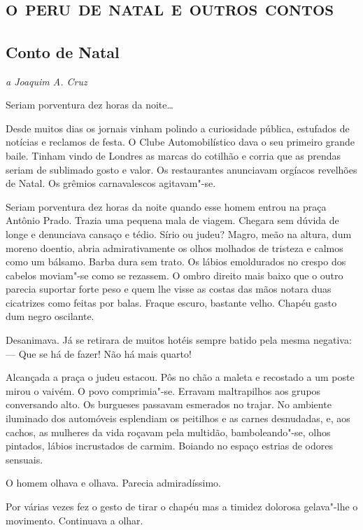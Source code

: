 \part{\textsc{o peru de natal e outros contos}}

\chapter{Conto de Natal}

\hfill{}\emph{a Joaquim A. Cruz}\bigskip


\noindent{}Seriam porventura dez horas da noite\ldots{}

Desde muitos dias os jornais vinham polindo a curiosidade pública,
estufados de notícias e reclamos de festa. O Clube Automobilístico dava
o seu primeiro grande baile. Tinham vindo de Londres as marcas do
cotilhão e corria que as prendas seriam de sublimado gosto e valor. Os
restaurantes anunciavam orgíacos revelhões de Natal. Os grêmios
carnavalescos agitavam"-se.

Seriam porventura dez horas da noite quando esse homem entrou na praça
Antônio Prado. Trazia uma pequena mala de viagem. Chegara sem dúvida de
longe e denunciava cansaço e tédio. Sírio ou judeu? Magro, meão na
altura, dum moreno doentio, abria admirativamente os olhos molhados de
tristeza e calmos como um bálsamo. Barba dura sem trato. Os lábios
emoldurados no crespo dos cabelos moviam"-se como se rezassem. O ombro
direito mais baixo que o outro parecia suportar forte peso e quem lhe
visse as costas das mãos notara duas cicatrizes como feitas por balas.
Fraque escuro, bastante velho. Chapéu gasto dum negro oscilante.

Desanimava. Já se retirara de muitos hotéis sempre batido pela mesma
negativa: --- Que se há de fazer! Não há mais quarto!

Alcançada a praça o judeu estacou. Pôs no chão a maleta e recostado a um
poste mirou o vaivém. O povo comprimia"-se. Erravam maltrapilhos aos
grupos conversando alto. Os burgueses passavam esmerados no trajar. No
ambiente iluminado dos automóveis esplendiam os peitilhos e as carnes
desnudadas, e, aos cachos, as mulheres da vida roçavam pela multidão,
bamboleando"-se, olhos pintados, lábios incrustados de carmim. Boiando no
espaço estrias de odores sensuais.

O homem olhava e olhava. Parecia admiradíssimo.

Por várias vezes fez o gesto de tirar o chapéu mas a timidez dolorosa
gelava"-lhe o movimento. Continuava a olhar.

